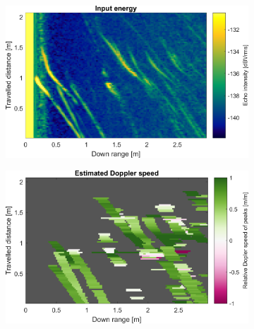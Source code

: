 \begin{figure}[htbp]
    \centering
    \begin{subfigure}[t]{0.475\linewidth}
        \centering
        \includegraphics[width=\linewidth,max height=.475\textheight]{gfx/results/kitchen_input.png}
    \end{subfigure}%
    \hfill%
    \begin{subfigure}[t]{0.475\linewidth}
        \centering
        \includegraphics[width=\linewidth,max height=.475\textheight]{gfx/results/kitchen_doppler.png}
    \end{subfigure}\bigskip\\
    \begin{subfigure}[t]{0.5\linewidth}
        \centering

\end{subfigure}
\end{figure}
